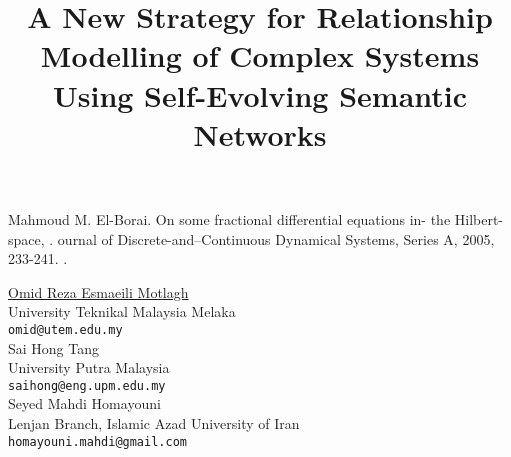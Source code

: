 \documentclass[article,A4,11pt]{llncs}%
\begin{document}

\begin{thebibliography}{10}
{\sc Mahmoud M. El-Borai}. {On some fractional differential  equations in- the Hilbert-space, }. ournal of Discrete-and--Continuous Dynamical Systems, Series A, 2005, 233-241. .
\end{thebibliography}

\title{A New Strategy for Relationship Modelling of Complex Systems Using Self-Evolving Semantic Networks}
 \author{} \institute{}
\maketitle
\begin{center}
{\large \underline{Omid Reza Esmaeili Motlagh}}\\
University Teknikal Malaysia Melaka\\
{\tt omid@utem.edu.my}
\\ \vspace{4mm}
{\large Sai Hong Tang}\\
University Putra Malaysia\\
{\tt saihong@eng.upm.edu.my}
\\ \vspace{4mm}
{\large Seyed Mahdi  Homayouni}\\
Lenjan Branch,  Islamic Azad University of Iran\\
{\tt homayouni.mahdi@gmail.com}
\end{center}
\end{document}
